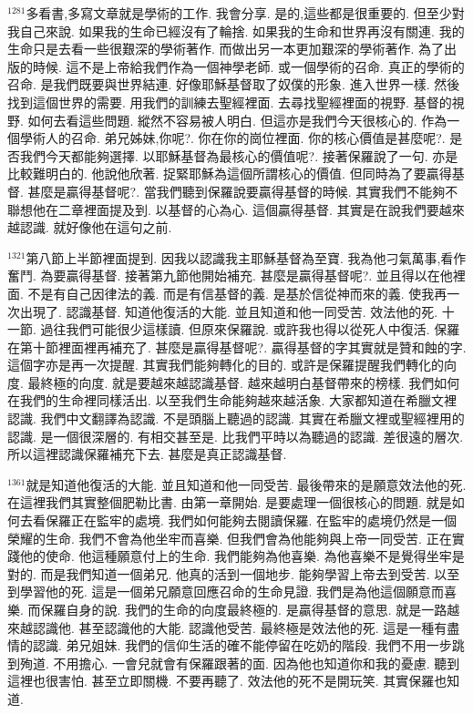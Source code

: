 \documentclass{book}
\begin{document}
$^{1281}$多看書,多寫文章就是學術的工作.
我會分享.
是的,這些都是很重要的.
但至少對我自己來說.
如果我的生命已經沒有了輪捨.
如果我的生命和世界再沒有關連.
我的生命只是去看一些很艱深的學術著作.
而做出另一本更加艱深的學術著作.
為了出版的時候.
這不是上帝給我們作為一個神學老師.
或一個學術的召命.
真正的學術的召命.
是我們既要與世界結連.
好像耶穌基督取了奴僕的形象.
進入世界一樣.
然後找到這個世界的需要.
用我們的訓練去聖經裡面.
去尋找聖經裡面的視野.
基督的視野.
如何去看這些問題.
縱然不容易被人明白.
但這亦是我們今天很核心的.
作為一個學術人的召命.
弟兄姊妹,你呢?.
你在你的崗位裡面.
你的核心價值是甚麼呢?.
是否我們今天都能夠選擇.
以耶穌基督為最核心的價值呢?.
接著保羅說了一句.
亦是比較難明白的.
他說他欣著.
捉緊耶穌為這個所謂核心的價值.
但同時為了要贏得基督.
甚麼是贏得基督呢?.
當我們聽到保羅說要贏得基督的時候.
其實我們不能夠不聯想他在二章裡面提及到.
以基督的心為心.
這個贏得基督.
其實是在說我們要越來越認識.
就好像他在這句之前.

$^{1321}$第八節上半節裡面提到.
因我以認識我主耶穌基督為至寶.
我為他刁氣萬事,看作奮鬥.
為要贏得基督.
接著第九節他開始補充.
甚麼是贏得基督呢?.
並且得以在他裡面.
不是有自己因律法的義.
而是有信基督的義.
是基於信從神而來的義.
使我再一次出現了.
認識基督.
知道他復活的大能.
並且知道和他一同受苦.
效法他的死.
十一節.
過往我們可能很少這樣讀.
但原來保羅說.
或許我也得以從死人中復活.
保羅在第十節裡面裡再補充了.
甚麼是贏得基督呢?.
贏得基督的字其實就是贊和蝕的字.
這個字亦是再一次提醒.
其實我們能夠轉化的目的.
或許是保羅提醒我們轉化的向度.
最終極的向度.
就是要越來越認識基督.
越來越明白基督帶來的榜樣.
我們如何在我們的生命裡同樣活出.
以至我們生命能夠越來越活象.
大家都知道在希臘文裡認識.
我們中文翻譯為認識.
不是頭腦上聽過的認識.
其實在希臘文裡或聖經裡用的認識.
是一個很深層的.
有相交甚至是.
比我們平時以為聽過的認識.
差很遠的層次.
所以這裡認識保羅補充下去.
甚麼是真正認識基督.

$^{1361}$就是知道他復活的大能.
並且知道和他一同受苦.
最後帶來的是願意效法他的死.
在這裡我們其實整個肥勒比書.
由第一章開始.
是要處理一個很核心的問題.
就是如何去看保羅正在監牢的處境.
我們如何能夠去閱讀保羅.
在監牢的處境仍然是一個榮耀的生命.
我們不會為他坐牢而喜樂.
但我們會為他能夠與上帝一同受苦.
正在實踐他的使命.
他這種願意付上的生命.
我們能夠為他喜樂.
為他喜樂不是覺得坐牢是對的.
而是我們知道一個弟兄.
他真的活到一個地步.
能夠學習上帝去到受苦.
以至到學習他的死.
這是一個弟兄願意回應召命的生命見證.
我們是為他這個願意而喜樂.
而保羅自身的說.
我們的生命的向度最終極的.
是贏得基督的意思.
就是一路越來越認識他.
甚至認識他的大能.
認識他受苦.
最終極是效法他的死.
這是一種有盡情的認識.
弟兄姐妹.
我們的信仰生活的確不能停留在吃奶的階段.
我們不用一步跳到殉道.
不用擔心.
一會兒就會有保羅跟著的面.
因為他也知道你和我的憂慮.
聽到這裡也很害怕.
甚至立即關機.
不要再聽了.
效法他的死不是開玩笑.
其實保羅也知道.
\end{document}

